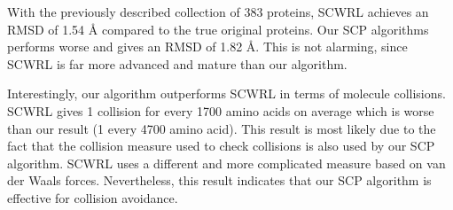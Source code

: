 With the previously described collection of 383 proteins, SCWRL achieves an RMSD of 1.54 Å compared to the true original proteins. 
Our SCP algorithms performs worse and gives an RMSD of 1.82 Å.
This is not alarming, since SCWRL is far more advanced and mature than our algorithm. 

Interestingly, our algorithm outperforms SCWRL in terms of molecule collisions.
SCWRL gives 1 collision for every 1700 amino acids on average which is worse than our result (1 every 4700 amino acid).
This result is most likely due to the fact that the collision measure used to check collisions is also used by our SCP algorithm.
SCWRL uses a different and more complicated measure based on van der Waals forces.
Nevertheless, this result indicates that our SCP algorithm is effective for collision avoidance. 



